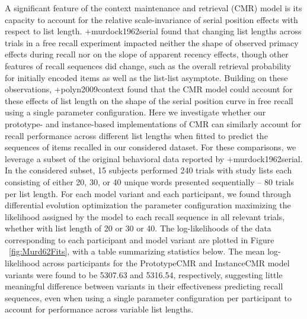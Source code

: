 A significant feature of the context maintenance and retrieval (CMR) model is its capacity to account for the relative scale-invariance of serial position effects with respect to list length. +{}{}{murdock1962serial} found that changing list lengths across trials in a free recall experiment impacted neither the shape of observed primacy effects during recall nor on the slope of apparent recency effects, though other features of recall sequences did change, such as the overall retrieval probability for initially encoded items as well as the list-list asymptote. Building on these observations, +{}{}{polyn2009context} found that the CMR model could account for these effects of list length on the shape of the serial position curve in free recall using a single parameter configuration.\markdownRendererInterblockSeparator
{}Here we investigate whether our prototype- and instance-based implementations of CMR can similarly account for recall performance across different list lengths when fitted to predict the sequences of items recalled in our considered dataset. For these comparisons, we leverage a subset of the original behavioral data reported by +{}{}{murdock1962serial}. In the considered subset, 15 subjects performed 240 trials with study lists each consisting of either 20, 30, or 40 unique words presented sequentially -- 80 trials per list length.\markdownRendererInterblockSeparator
{}For each model variant and each participant, we found through differential evolution optimization the parameter configuration maximizing the likelihood assigned by the model to each recall sequence in all relevant trials, whether with list length of 20 or 30 or 40. The log-likelihoods of the data corresponding to each participant and model variant are plotted in Figure ~\ref{fig:Murd62Fits}, with a table summarizing statistics below. The mean log-likelihood across participants for the PrototypeCMR and InstanceCMR model variants were found to be 5307.63 and 5316.54, respectively, suggesting little meaningful difference between variants in their effectiveness predicting recall sequences, even when using a single parameter configuration per participant to account for performance across variable list lengths.\markdownRendererInterblockSeparator
